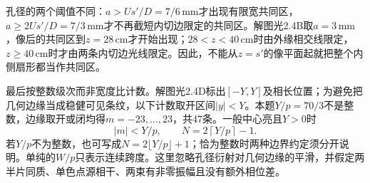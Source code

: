 \documentclass[UTF8,fontset=fandol,a4paper,11pt]{ctexart}
\begin{document}
孔径的两个阈值不同：$a>Us'/D=7/6\,\mathrm{mm}$才出现有限宽共同区，$a\ge2Us'/D=7/3\,\mathrm{mm}$才不再截短内切边限定的共同区。解图光2.4B取$a=3\,\mathrm{mm}$，像后的共同区到$z=28\,\mathrm{cm}$才开始出现；$28<z<40\,\mathrm{cm}$时由外缘相交线限定，$z\ge40\,\mathrm{cm}$时才由两条内切边光线限定。因此，不能从$z=s'$的像平面起就把整个内侧扇形都当作共同区。

最后按整数级次而非宽度比计数。解图光2.4D标出$[-Y,Y]$及相长位置；为避免把几何边缘当成稳健可见条纹，以下计数取开区间$|y|<Y$。本题$Y/p=70/3$不是整数，边缘取开或闭均得$m=-23,\ldots,23$，共47条。一般中心亮且$Y>0$时
\[
|m|<Y/p,\qquad N=2\left\lceil Y/p\right\rceil-1.
\]
若$Y/p$不为整数，也可写成$N=2\lfloor Y/p\rfloor+1$；恰为整数时两种边界约定须分开说明。单纯的$W/p$只表示连续跨度。这里忽略孔径衍射对几何边缘的平滑，并假定两半片同质、单色点源相干、两束有非零振幅且没有额外相位差。
\end{document}
